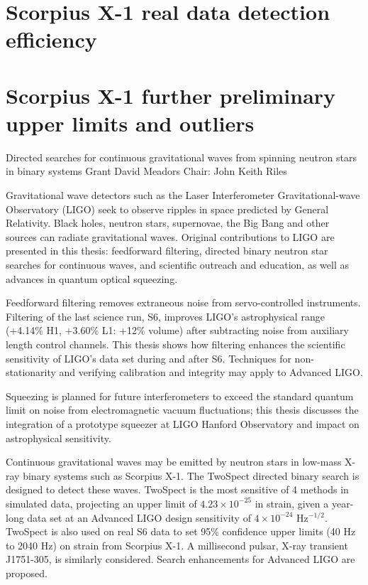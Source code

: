 \documentclass[leqno,twoside]{report}
\theoremstyle{plain}
\theoremstyle{definition}
\theoremstyle{remark}
\numberwithin{theorem}{chapter}        %
\begin{document}
\chapter{Scorpius X-1 real data detection efficiency}
\label{appendix2}

\chapter{Scorpius X-1 further preliminary upper limits and outliers}
\label{appendix3}





\startabstractpage
{Directed searches for continuous gravitational waves from spinning neutron stars in binary systems } {Grant David Meadors} {Chair: John Keith Riles}

Gravitational wave detectors such as the Laser Interferometer Gravitational-wave Observatory (LIGO) seek to observe ripples in space predicted by General Relativity. 
Black holes, neutron stars, supernovae, the Big Bang and other sources can radiate gravitational waves.
Original contributions to LIGO are presented in this thesis: feedforward filtering, directed binary neutron star searches for continuous waves, and scientific outreach and education, as well as advances in quantum optical squeezing.

Feedforward filtering removes extraneous noise from servo-controlled instruments.
Filtering of the last science run, S6, improves LIGO's astrophysical range (+4.14\% H1, +3.60\% L1: +12\% volume) after subtracting noise from auxiliary length control channels.
This thesis shows how filtering enhances the scientific sensitivity of LIGO's data set during and after S6.
Techniques for non-stationarity and verifying calibration and integrity may apply to Advanced LIGO.

Squeezing is planned for future interferometers to exceed the standard quantum limit on noise from electromagnetic vacuum fluctuations; this thesis discusses the integration of a prototype squeezer at LIGO Hanford Observatory and impact on astrophysical sensitivity.  

Continuous gravitational waves may be emitted by neutron stars in low-mass X-ray binary systems such as Scorpius X-1.
The TwoSpect directed binary search is designed to detect these waves.
TwoSpect is the most sensitive of 4 methods in simulated data, projecting an upper limit of $4.23\times 10^{-25}$ in strain, given a year-long data set at an Advanced LIGO design sensitivity of $4\times 10^{-24}$ Hz$^{-1/2}$.
TwoSpect is also used on real S6 data to set 95\% confidence upper limits (40 Hz to 2040 Hz) on strain from Scorpius X-1.
A millisecond pulsar, X-ray transient J1751-305, is similarly considered.
Search enhancements for Advanced LIGO are proposed.
\end{document}
